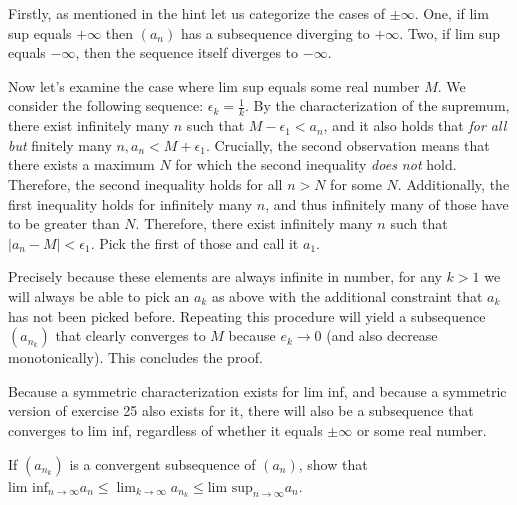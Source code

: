\begin{solution}

    Firstly, as mentioned in the hint let us categorize the cases of $\pm\infty$. One, if lim sup equals $+\infty$ then $(a_n)$ has a subsequence diverging to $+\infty$. Two, if lim sup equals $-\infty$, then the sequence itself diverges to $-\infty$.

    Now let's examine the case where lim sup equals some real number $M$. We consider the following sequence: $\epsilon_k = \frac{1}{k}$. By the characterization of the supremum, there exist infinitely many $n$ such that $M - \epsilon_1 < a_n$, and it also holds that \textit{for all but} finitely many $n, a_n < M + \epsilon_1$. Crucially, the second observation means that there exists a maximum $N$ for which the second inequality \textit{does not} hold. Therefore, the second inequality holds for all $n > N$ for some $N$. Additionally, the first inequality holds for infinitely many $n$, and thus infinitely many of those have to be greater than $N$. Therefore, there exist infinitely many $n$ such that $\lvert a_n - M \rvert < \epsilon_1$. Pick the first of those and call it $a_{1}$. 
    
    Precisely because these elements are always infinite in number, for any $k > 1$ we will always be able to pick an $a_k$ as above with the additional constraint that $a_k$ has not been picked before. Repeating this procedure will yield a subsequence $(a_{n_k})$ that clearly converges to $M$ because $e_k \rightarrow 0$ (and also decrease monotonically). This concludes the proof.

    Because a symmetric characterization exists for lim inf, and because a symmetric version of exercise 25 also exists for it, there will also be a subsequence that converges to lim inf, regardless of whether it equals $\pm\infty$ or some real number.
\end{solution}

\begin{exercise}{29}
    If $(a_{n_k})$ is a convergent subsequence of $(a_n)$, show that $\text{lim inf}_{n \rightarrow \infty} a_n \leq \lim_{k \rightarrow \infty} a_{n_k} \leq \text{lim sup}_{n \rightarrow \infty} a_n$.
\end{exercise}

